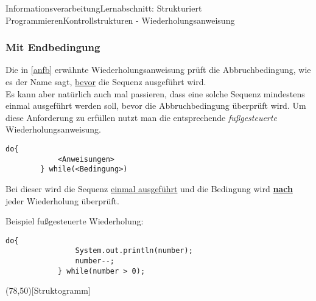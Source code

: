 \documentclass[11pt,oneside,openany,headings=optiontotoc,11pt,numbers=noenddot]{article}
\begin{document}
\begin{worksheet}{Informationsverarbeitung}{Lernabschnitt: Strukturiert Programmieren}{Kontrollstrukturen - Wiederholungsanweisung}
		\subsubsection{Mit Endbedingung}
		Die in \ref{anfb} erwähnte Wiederholungsanweisung prüft die Abbruchbedingung, wie es der Name sagt, \underline{bevor} die Sequenz ausgeführt wird.\\
		Es kann aber natürlich auch mal passieren, dass eine solche Sequenz mindestens einmal ausgeführt werden soll, bevor die Abbruchbedingung überprüft wird. Um diese Anforderung zu erfüllen nutzt man die entsprechende \textit{fußgesteuerte} Wiederholungsanweisung.
		\begin{lstlisting}[style=Python]
		do{
			<Anweisungen>
		} while(<Bedingung>)
		\end{lstlisting}
		\par\noindent
		Bei dieser wird die Sequenz \underline{einmal ausgeführt} und die Bedingung wird \textbf{\underline{nach}} jeder Wiederholung überprüft.
		\par\noindent
		\begin{minipage}[t]{0.48\textwidth}
			\vspace*{0pt}
			Beispiel fußgesteuerte Wiederholung:
			\begin{lstlisting}[style=Python,frame=single]
			do{
				System.out.println(number);
				number--;
			} while(number > 0);
			\end{lstlisting}
		\end{minipage}
		\hfill
		\begin{minipage}[t]{0.48\textwidth}
			\vspace*{0pt}
			\begin{struktogramm}(78,50)[Struktogramm]
				\untilend
			\end{struktogramm}
		\end{minipage}
	\end{worksheet}
\end{document}
